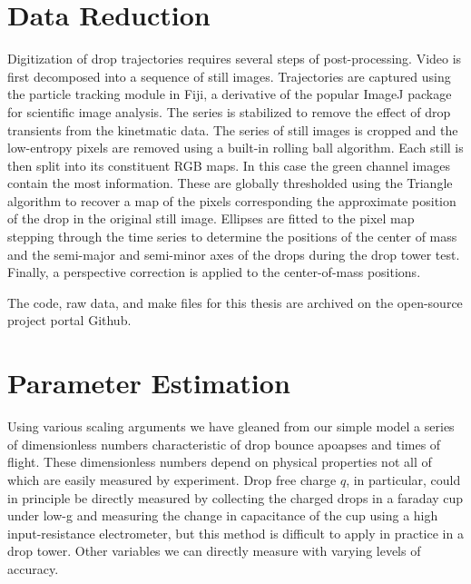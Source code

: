 \documentclass[12pt,a4paper,oneside]{book}
\begin{document}
\section{Data Reduction}
Digitization of drop trajectories requires several steps of post-processing. Video is first decomposed into a sequence of still images. Trajectories are captured using the particle tracking module in Fiji\cite{schindelin_fiji:_2012}, a derivative of the popular ImageJ\cite{schneider_nih_2012} package for scientific image analysis. The series is stabilized to remove the effect of drop transients from the kinetmatic data\cite{li_image_2008}. The series of still images is cropped and the low-entropy pixels are removed using a built-in rolling ball algorithm. Each still is then split into its constituent RGB maps. In this case the green channel images contain the most information. These are globally thresholded using the Triangle algorithm to recover a map of the pixels corresponding the approximate position of the drop in the original still image. Ellipses are fitted to the pixel map stepping through the time series to determine the positions of the center of mass and the semi-major and semi-minor axes of the drops during the drop tower test. Finally, a perspective correction is applied to the center-of-mass positions. 

The code, raw data, and make files for this thesis are archived on the open-source project portal Github\cite{schmidt_droplet_electro-bounce:_2017}.

\section{Parameter Estimation}
Using various scaling arguments we have gleaned from our simple model a series of dimensionless numbers characteristic of drop bounce apoapses and times of flight. These dimensionless numbers depend on physical properties not all of which are easily measured by experiment. Drop free charge $q$, in particular, could in principle be directly measured by collecting the charged drops in a faraday cup under low-g and measuring the change in capacitance of the cup using a high input-resistance electrometer, but this method is difficult to apply in practice in a drop tower. Other variables we can directly measure with varying levels of accuracy. 
\end{document}
